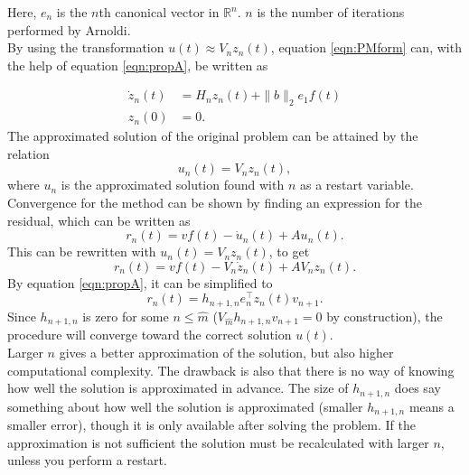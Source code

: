 \noindent Here, $e_n$ is the $n$th canonical vector in $\mathbb{R}^n$. $n$ is the number of iterations performed by Arnoldi.\\

\noindent By using the transformation $u(t) \approx V_n z_n(t)$, equation \eqref{eqn:PMform} can, with the help of equation \eqref{eqn:propA}, be written as

\begin{equation}
\begin{aligned}
\dot{z}_n(t) &= H_n z_n(t) + \| b\|_2 e_1 f(t)  \\
z_n(0) &= 0.
\label{eqn:KPMi}
\end{aligned}
\end{equation}
The approximated solution of the original problem can be attained by the relation
\begin{equation*}
u_n(t) = V_n z_n(t),
\end{equation*}
where $u_n$ is the approximated solution found with $n$ as a restart variable. \\

\noindent Convergence for the method can be shown by finding an expression for the residual, which can be written as
\begin{equation*}
r_n(t) = v f(t) -\dot{u}_n(t) + A u_n(t).
\end{equation*}
This can be rewritten with $u_n(t) = V_n z_n(t)$, to get
\begin{equation*}
r_n(t) = v f(t) - V_n \dot{z}_n(t) + A V_n z_n(t).
\end{equation*}
By equation \eqref{eqn:propA}, it can be simplified to
\begin{equation}
r_n(t) = h_{n+1,n} e_n^\top z_n(t) v_{n+1}.
\label{eqn:Aresidual}
\end{equation}
\noindent Since $h_{n+1,n}$ is zero for some $n \leq \hat{m}$ ($V_{\hat{m}} h_{n+1,n} v_{n+1} = 0 $ by construction), the procedure will converge toward the correct solution $u(t)$. \\

\noindent Larger $n$ gives a better approximation of the solution, but also higher computational complexity. The drawback is also that there is no way of knowing how well the solution is approximated in advance. The size of $h_{n+1,n}$ does say something about how well the solution is approximated (smaller $h_{n+1,n}$ means a smaller error), though it is only available after solving the problem. If the approximation is not sufficient the solution must be recalculated with larger $n$, unless you perform a restart. \\


